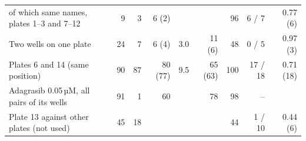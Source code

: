 \begin{table}[!htbp]
{\begin{minipage}{183mm}
\begin{tabular}{@{}>{\raggedright\arraybackslash}p{50mm}rrrrrrrr@{}}
\quad of which same names, plates 1--3 and 7--12 & 9 & 3 & 6 (2) & & & 96 & 6 / 7 & 0.77 (6) \\
Two wells on one plate & 24 & 7 & 6 (4) & 3.0 & 11 (6) & 48 & 0 / 5 & 0.97 (3) \\
Plates 6 and 14 (same position) & 90 & 87 & 80 (77) & 9.5 & 65 (63) & 100 & 17 / 18 & 0.71 (18) \\
Adagrasib 0.05\,µM, all pairs of its wells & 91 & 1 & 60 & & 78 & 98 & -- & \\
Plate 13 against other plates (not used) & 45 & 18 & & & & 44 & 1 / 10 & 0.44 (6) \\
\bottomrule\end{tabular}
\end{minipage}}
\makebox[\textwidth][c]{\usebox{\tbox}}
\end{table}

